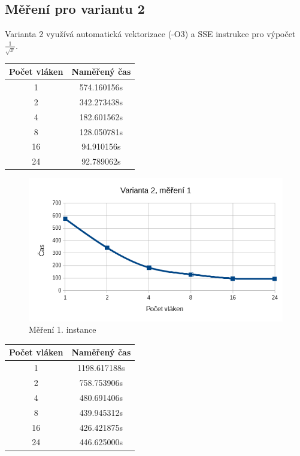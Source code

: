 \documentclass[12pt]{article}
\begin{document}
\subsection{Měření pro variantu 2}
Varianta 2 využívá automatická vektorizace (-O3) a SSE instrukce pro výpočet ${\frac{1}{\sqrt{x}}}$.
%
%
\begin{center}
\begin{tabular}{ c | c }
\textbf{Počet vláken} & \textbf{Naměřený čas} \\ \hline \hline 
1 & 574.160156s \\ \hline
2 & 342.273438s \\ \hline
4 & 182.601562s \\ \hline
8 & 128.050781s \\ \hline
16 & 94.910156s \\ \hline
24 & 92.789062s \\ \hline
\end{tabular}
\end{center}

\begin{figure}[H]
  \begin{center}
     \includegraphics[width=12cm]{images/sse1.png}
    \caption{Měření 1. instance} 
  \end{center}
\end{figure}
%
%
\begin{center}
\begin{tabular}{ c | c }
\textbf{Počet vláken} & \textbf{Naměřený čas} \\ \hline \hline 
1 & 1198.617188s \\ \hline
2 & 758.753906s \\ \hline
4 & 480.691406s \\ \hline
8 & 439.945312s \\ \hline
16 & 426.421875s \\ \hline
24 & 446.625000s \\ \hline
\end{tabular}
\end{center}
\end{document}
